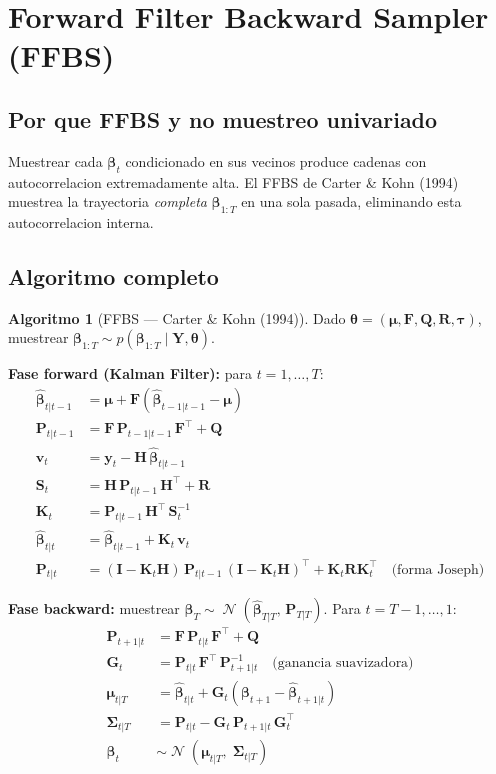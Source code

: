 \documentclass[12pt, a4paper]{article}
\theoremstyle{plain}
\theoremstyle{definition}
\newtheorem{algoritmo}{Algoritmo}[section]
\theoremstyle{remark}
\newcommand{\bbet}{\bm{\beta}}
\newcommand{\btau}{\bm{\tau}}
\newcommand{\bmu}{\bm{\mu}}
\newcommand{\bY}{\mathbf{Y}}
\newcommand{\by}{\mathbf{y}}
\newcommand{\bH}{\mathbf{H}}
\newcommand{\bF}{\mathbf{F}}
\newcommand{\bQ}{\mathbf{Q}}
\newcommand{\bR}{\mathbf{R}}
\newcommand{\bI}{\mathbf{I}}
\newcommand{\bP}{\mathbf{P}}
\newcommand{\bK}{\mathbf{K}}
\newcommand{\bG}{\mathbf{G}}
\newcommand{\bS}{\mathbf{S}}
\DeclareMathOperator{\N}{\mathcal{N}}
\begin{document}
\section{Forward Filter Backward Sampler (FFBS)}
\label{sec:ffbs}

\subsection{Por que FFBS y no muestreo univariado}

Muestrear cada $\bbet_t$ condicionado en sus vecinos produce cadenas con
autocorrelacion extremadamente alta. El FFBS de Carter \& Kohn (1994)
muestrea la trayectoria \emph{completa} $\bbet_{1:T}$ en una sola pasada,
eliminando esta autocorrelacion interna.

\subsection{Algoritmo completo}

\begin{algoritmo}[FFBS --- Carter \& Kohn (1994)]
\label{alg:ffbs}
Dado $\bm{\theta} = (\bmu, \bF, \bQ, \bR, \btau)$,
muestrear $\bbet_{1:T} \sim p(\bbet_{1:T} \mid \bY, \bm{\theta})$.

\textbf{Fase forward (Kalman Filter):} para $t = 1, \ldots, T$:
\begin{align}
  \hat{\bbet}_{t|t-1} &= \bmu + \bF(\hat{\bbet}_{t-1|t-1} - \bmu) \\
  \bP_{t|t-1} &= \bF\,\bP_{t-1|t-1}\,\bF^\top + \bQ \\
  \bm{v}_t &= \by_t - \bH\,\hat{\bbet}_{t|t-1} \\
  \bS_t &= \bH\,\bP_{t|t-1}\,\bH^\top + \bR \\
  \bK_t &= \bP_{t|t-1}\,\bH^\top\,\bS_t^{-1} \\
  \hat{\bbet}_{t|t} &= \hat{\bbet}_{t|t-1} + \bK_t\,\bm{v}_t \\
  \bP_{t|t} &= (\bI - \bK_t\bH)\,\bP_{t|t-1}\,(\bI - \bK_t\bH)^\top
               + \bK_t\bR\bK_t^\top \quad \text{(forma Joseph)}
  \label{eq:joseph}
\end{align}

\textbf{Fase backward:}
muestrear $\bbet_T \sim \N(\hat{\bbet}_{T|T},\, \bP_{T|T})$.
Para $t = T-1,\ldots,1$:
\begin{align}
  \bP_{t+1|t} &= \bF\,\bP_{t|t}\,\bF^\top + \bQ \\
  \bG_t &= \bP_{t|t}\,\bF^\top\,\bP_{t+1|t}^{-1}
           \quad\text{(ganancia suavizadora)} \\
  \bm{\mu}_{t|T} &= \hat{\bbet}_{t|t}
    + \bG_t\!\left(\bbet_{t+1} - \hat{\bbet}_{t+1|t}\right) \\
  \bm{\Sigma}_{t|T} &= \bP_{t|t} - \bG_t\,\bP_{t+1|t}\,\bG_t^\top \\
  \bbet_t &\sim \N\!\left(\bm{\mu}_{t|T},\;\bm{\Sigma}_{t|T}\right)
\end{align}
\end{algoritmo}
\end{document}
